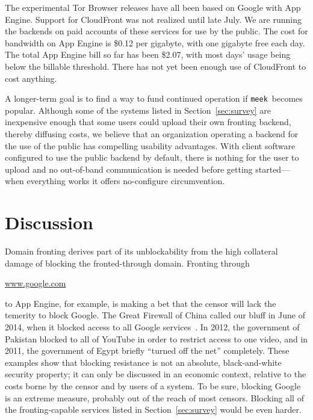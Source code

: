 \documentclass[conference]{IEEEtran}
\newcommand{\meek}{\texttt{meek}\xspace}
\def\urll#1{\begin{NoHyper}\url{#1}\end{NoHyper}}
\begin{document}
The experimental Tor Browser releases have all been based on Google with App Engine.
Support for CloudFront was not realized until late July.
We are running the backends on paid accounts of these services for use by the public.
The cost for bandwidth on App Engine is \$0.12 per gigabyte,
with one gigabyte free each day.
The total App Engine bill so far has been \$2.07,
with most days' usage being below the billable threshold.
There has not yet been enough use of CloudFront to cost anything.

A longer-term goal is to find a way to fund continued operation
if \meek\ becomes popular.
Although some of the systems listed in Section~\ref{sec:survey}
are inexpensive enough that some users could upload their own fronting backend,
thereby diffusing costs,
we believe that an organization operating a backend for the use of the public
has compelling usability advantages.
With client software configured to use the public backend by default,
there is nothing for the user to upload and no out-of-band communication is needed before getting
started---when everything works it offers no-configure circumvention.


\section{Discussion}
\label{sec:discussion}

Domain fronting derives part of its unblockability from the
high collateral damage of blocking the fronted-through domain.
Fronting through \urll{www.google.com} to App Engine, for example,
is making a bet that the censor will lack the temerity to block Google.
The Great Firewall of China called our bluff in June of 2014,
when it blocked access to all Google services~\cite{cn-google-block}.
In 2012, the government of Pakistan blocked to all of YouTube
in order to restrict access to one video,
and in 2011, the government of Egypt briefly ``turned off the net'' completely.
These examples show that blocking resistance is not an absolute,
black-and-white security property;
it can only be discussed in an economic context, relative to the costs borne
by the censor and by users of a system.
To be sure, blocking Google is an extreme measure,
probably out of the reach of most censors.
Blocking all of the fronting-capable services listed in
Section~\ref{sec:survey} would be even harder.
\end{document}
